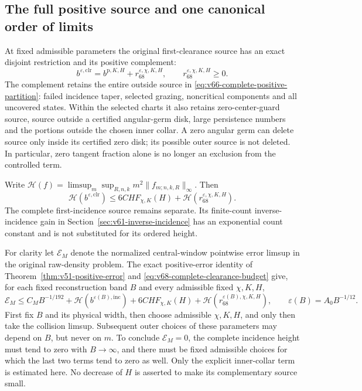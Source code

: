 \subsection{The full positive source and one canonical order of limits}
At fixed admissible parameters the original first-clearance source has
an exact disjoint restriction and its positive complement:
\begin{equation}\label{eq:v68-complete-source-partition}
 b^{\varepsilon,\mathrm{clr}}
       =b^{\mathrm p,K,H}+r_{68}^{\varepsilon,\chi,K,H},
                    \qquad r_{68}^{\varepsilon,\chi,K,H}\ge0.
\end{equation}
The complement retains the entire outside source in
\eqref{eq:v66-complete-positive-partition}: failed incidence taper,
selected grazing, noncritical components and all uncovered states.
Within the selected charts it also retains zero-center-guard source,
source outside a certified angular-germ disk, large persistence
numbers and the portions outside the chosen inner collar. A zero
angular germ can delete source only inside its certified zero disk;
its possible outer source is not deleted. In particular, zero tangent
fraction alone is no longer an exclusion from the controlled term.

Write $\mathcal H(f)=\limsup_m\sup_{R,n,k}m^2\|f_{m;n,k,R}\|_\infty$.
Then
\begin{equation}\label{eq:v68-complete-clearance-budget}
 \mathcal H(b^{\varepsilon,\mathrm{clr}})
    \le6CH F_{\chi,K}(H)+
                      \mathcal H(r_{68}^{\varepsilon,\chi,K,H}).
\end{equation}
The complete first-incidence source remains separate. Its finite-count
inverse-incidence gain in Section~\ref{sec:v61-inverse-incidence}
has an exponential count constant and is not substituted for its
ordered height.

For clarity let $\mathcal E_M$ denote the normalized central-window
pointwise error limsup in the original raw-density problem. The exact
positive-error identity of Theorem~\ref{thm:v51-positive-error} and
\eqref{eq:v68-complete-clearance-budget} give, for each fixed
reconstruction band $B$ and every admissible fixed $\chi,K,H$,
\begin{equation}\label{eq:v68-canonical-endpoint-budget}
 \mathcal E_M\le C_M B^{-1/192}
   +\mathcal H(b^{\varepsilon(B),\mathrm{inc}})
   +6CH F_{\chi,K}(H)
   +\mathcal H(r_{68}^{\varepsilon(B),\chi,K,H}),
 \qquad \varepsilon(B)=A_0B^{-1/12}.
\end{equation}
First fix $B$ and its physical width, then choose admissible
$\chi,K,H$, and only then take the collision limsup. Subsequent
outer choices of these parameters may depend on $B$, but never on
$m$. To conclude $\mathcal E_M=0$, the complete incidence height
must tend to zero with $B\to\infty$, and there must be fixed
admissible choices for which the last two terms tend to zero as well.
Only the explicit inner-collar term is estimated here. No decrease
of $H$ is asserted to make its complementary source small.

